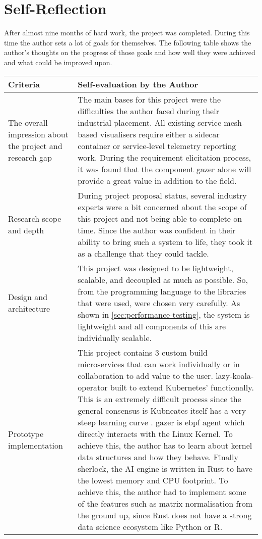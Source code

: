 \section{Self-Reflection}

After almost nine months of hard work, the project was completed. During this time the author sets a lot of goals for themselves. The following table shows the author's thoughts on the progress of those goals and how well they were achieved and what could be improved upon.

\begin{longtable}{|p{33mm}|p{120mm}|}
    \hline
    \textbf{Criteria} &
    \textbf{Self-evaluation by the Author} \\ \hline
  The overall impression about the project and research gap &
    The main bases for this project were the difficulties the author faced during their industrial placement. All existing service mesh-based visualisers require either a sidecar container or service-level telemetry reporting work. During the requirement elicitation process, it was found that the component \ac{gazer} alone will provide a great value in addition to the field. \\ \hline
  Research scope and depth &
    During project proposal status, several industry experts were a bit concerned about the scope of this project and not being able to complete on time. Since the author was confident in their ability to bring such a system to life, they took it as a challenge that they could tackle. \\ \hline
  Design and architecture &
    This project was designed to be lightweight, scalable, and decoupled as much as possible. So, from the programming language to the libraries that were used, were chosen very carefully. As shown in \ref{sec:performance-testing}, the system is lightweight and all components of this are individually scalable. \\ \hline
  Prototype implementation &
    This project contains 3 custom build microservices that can work individually or in collaboration to add value to the user. \ac{lazy-koala-operator} built to extend Kubernetes' functionally. This is an extremely difficult process since the general consensus is Kubneates itself has a very steep learning curve \citep{Googlead4:online}. \ac{gazer} is \ac{ebpf} agent which directly interacts with the Linux Kernel. To achieve this, the author has to learn about kernel data structures and how they behave. Finally \ac{sherlock}, the AI engine is written in Rust to have the lowest memory and CPU footprint. To achieve this, the author had to implement some of the features such as matrix normalisation from the ground up, since Rust does not have a strong data science ecosystem like Python or R. \\ \hline

\end{longtable}
